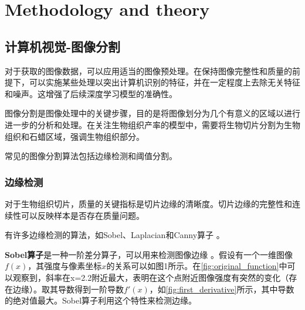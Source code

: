 \section{Methodology and theory}
\label{sec:problem_description}

\subsection{计算机视觉-图像分割}

对于获取的图像数据，可以应用适当的图像预处理。在保持图像完整性和质量的前提下，可以实施某些处理以突出计算机识别的特征，并在一定程度上去除无关特征和噪声。这增强了后续深度学习模型的准确性。

图像分割是图像处理中的关键步骤，目的是将图像划分为几个有意义的区域以进行进一步的分析和处理。在关注生物组织产率的模型中，需要将生物切片分割为生物组织和石蜡区域，强调生物组织部分。

常见的图像分割算法包括边缘检测和阈值分割。

\subsubsection{边缘检测}
对于生物组织切片，质量的关键指标是切片边缘的清晰度。切片边缘的完整性和连续性可以反映样本是否存在质量问题。

有许多边缘检测的算法，如Sobel、Laplacian和Canny算子 \cite{3.1}。

\textbf{Sobel算子}是一种一阶差分算子，可以用来检测图像边缘 \cite{补充1}。假设有一个一维图像$f(x)$，其强度与像素坐标$x$的关系可以如图1所示。在\autoref{fig:original_function}中可以观察到，斜率在x=2.2附近最大，表明在这个点附近图像强度有突然的变化（存在边缘）。取其导数得到一阶导数$f'(x)$，如\autoref{fig:first_derivative}所示，其中导数的绝对值最大。Sobel算子利用这个特性来检测边缘。

